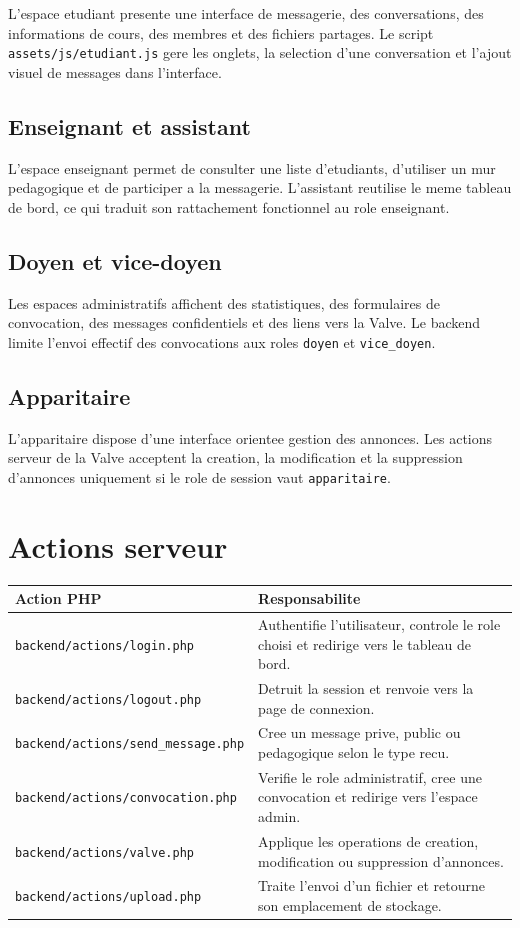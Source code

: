 \documentclass[12pt,a4paper]{article}
\begin{document}
L'espace etudiant presente une interface de messagerie, des conversations, des informations de cours, des membres et des fichiers partages. Le script \texttt{assets/js/etudiant.js} gere les onglets, la selection d'une conversation et l'ajout visuel de messages dans l'interface.

\subsection{Enseignant et assistant}

L'espace enseignant permet de consulter une liste d'etudiants, d'utiliser un mur pedagogique et de participer a la messagerie. L'assistant reutilise le meme tableau de bord, ce qui traduit son rattachement fonctionnel au role enseignant.

\subsection{Doyen et vice-doyen}

Les espaces administratifs affichent des statistiques, des formulaires de convocation, des messages confidentiels et des liens vers la Valve. Le backend limite l'envoi effectif des convocations aux roles \texttt{doyen} et \texttt{vice\_doyen}.

\subsection{Apparitaire}

L'apparitaire dispose d'une interface orientee gestion des annonces. Les actions serveur de la Valve acceptent la creation, la modification et la suppression d'annonces uniquement si le role de session vaut \texttt{apparitaire}.

\section{Actions serveur}

\begin{longtable}{|p{5cm}|p{9cm}|}
\hline
\textbf{Action PHP} & \textbf{Responsabilite} \\
\hline
\texttt{backend/actions/login.php} & Authentifie l'utilisateur, controle le role choisi et redirige vers le tableau de bord. \\
\hline
\texttt{backend/actions/logout.php} & Detruit la session et renvoie vers la page de connexion. \\
\hline
\texttt{backend/actions/send\_message.php} & Cree un message prive, public ou pedagogique selon le type recu. \\
\hline
\texttt{backend/actions/convocation.php} & Verifie le role administratif, cree une convocation et redirige vers l'espace admin. \\
\hline
\texttt{backend/actions/valve.php} & Applique les operations de creation, modification ou suppression d'annonces. \\
\hline
\texttt{backend/actions/upload.php} & Traite l'envoi d'un fichier et retourne son emplacement de stockage. \\
\hline
\end{longtable}
\end{document}

